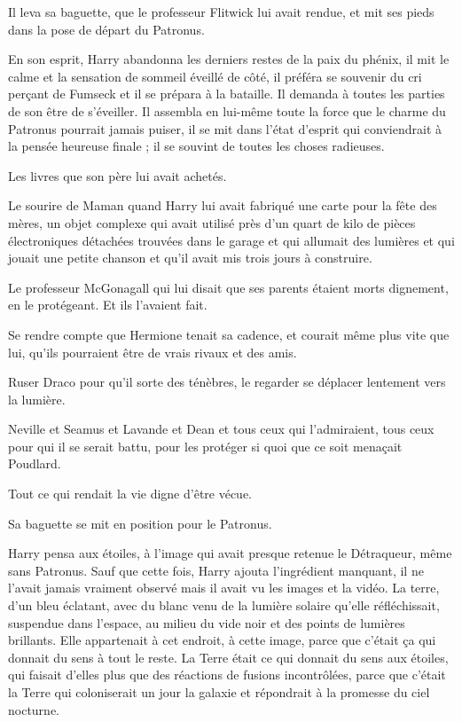 Il leva sa baguette, que le professeur Flitwick lui avait rendue, et mit ses pieds dans la pose de départ du Patronus.

En son esprit, Harry abandonna les derniers restes de la paix du phénix, il mit le calme et la sensation de sommeil éveillé de côté, il préféra se souvenir du cri perçant de Fumseck et il se prépara à la bataille. Il demanda à toutes les parties de son être de s'éveiller. Il assembla en lui-même toute la force que le charme du Patronus pourrait jamais puiser, il se mit dans l'état d'esprit qui conviendrait à la pensée heureuse finale ; il se souvint de toutes les choses radieuses.

Les livres que son père lui avait achetés.

Le sourire de Maman quand Harry lui avait fabriqué une carte pour la fête des mères, un objet complexe qui avait utilisé près d'un quart de kilo de pièces électroniques détachées trouvées dans le garage et qui allumait des lumières et qui jouait une petite chanson et qu'il avait mis trois jours à construire.

Le professeur McGonagall qui lui disait que ses parents étaient morts dignement, en le protégeant. Et ils l'avaient fait.

Se rendre compte que Hermione tenait sa cadence, et courait même plus vite que lui, qu'ils pourraient être de vrais rivaux et des amis.

Ruser Draco pour qu'il sorte des ténèbres, le regarder se déplacer lentement vers la lumière.

Neville et Seamus et Lavande et Dean et tous ceux qui l'admiraient, tous ceux pour qui il se serait battu, pour les protéger si quoi que ce soit menaçait Poudlard.

Tout ce qui rendait la vie digne d'être vécue.

Sa baguette se mit en position pour le Patronus.

Harry pensa aux étoiles, à l'image qui avait presque retenue le Détraqueur, même sans Patronus. Sauf que cette fois, Harry ajouta l'ingrédient manquant, il ne l'avait jamais vraiment observé mais il avait vu les images et la vidéo. La terre, d'un bleu éclatant, avec du blanc venu de la lumière solaire qu'elle réfléchissait, suspendue dans l'espace, au milieu du vide noir et des points de lumières brillants. Elle appartenait à cet endroit, à cette image, parce que c'était ça qui donnait du sens à tout le reste. La Terre était ce qui donnait du sens aux étoiles, qui faisait d'elles plus que des réactions de fusions incontrôlées, parce que c'était la Terre qui coloniserait un jour la galaxie et répondrait à la promesse du ciel nocturne.


